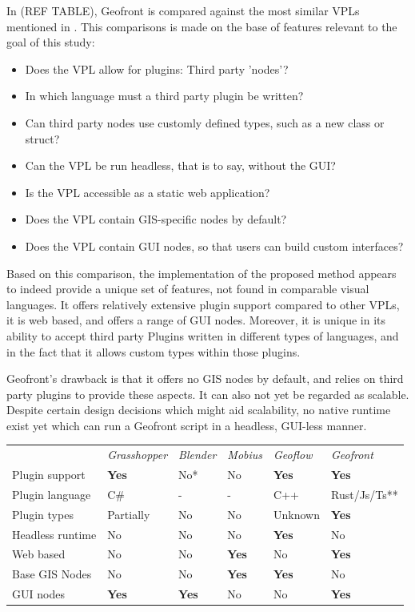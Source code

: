 In (REF TABLE), Geofront is compared against the most similar \ac{VPL}s mentioned in .
This comparisons is made on the base of features relevant to the goal of this study:
\begin{itemize}[-]
  \item Does the VPL allow for plugins: Third party 'nodes'?  
  \item In which language must a third party plugin be written?
  \item Can third party nodes use customly defined types, such as a new class or struct?
  \item Can the VPL be run headless, that is to say, without the \ac{GUI}?
  \item Is the VPL accessible as a static web application?
  \item Does the VPL contain GIS-specific nodes by default?
  \item Does the VPL contain \ac{GUI} nodes, so that users can build custom interfaces?
\end{itemize}

Based on this comparison, the implementation of the proposed method appears to indeed provide a unique set of features, not found in comparable visual languages. 
It offers relatively extensive plugin support compared to other VPLs, it is web based, and offers a range of \ac{GUI} nodes. 
Moreover, it is unique in its ability to accept third party Plugins written in different types of languages, and in the fact that it allows custom types within those plugins. 

Geofront's drawback is that it offers no GIS nodes by default, and relies on third party plugins to provide these aspects. 
It can also not yet be regarded as scalable. 
Despite certain design decisions which might aid scalability, no native runtime exist yet which can run a Geofront script in a headless, GUI-less manner.

\begin{tabular}{||p{2.8cm}|l|l|l|l|l||}
                  & \emph{Grasshopper} & \emph{Blender} & \emph{Mobius} & \emph{Geoflow}    & \emph{Geofront}   \\
Plugin support    & \textbf{Yes}  & No*    & No     & \textbf{Yes} & \textbf{Yes} \\
Plugin language   & C\#  & -    & -     & C++ & Rust/Js/Ts** \\
Plugin types      & Partially & No      & No     & Unknown    & \textbf{Yes} \\
Headless runtime  & No          & No      & No               & \textbf{Yes} & No         \\
Web based         & No          & No      & \textbf{Yes}     & No           & \textbf{Yes} \\
Base GIS Nodes    & No          & No      & \textbf{Yes}     & \textbf{Yes} & No \\
GUI nodes         & \textbf{Yes} & \textbf{Yes}      & No     & No          & \textbf{Yes} \\
\end{tabular}

